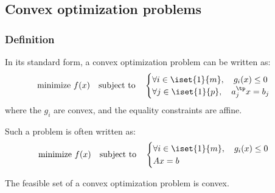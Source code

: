 \subsection{Convex optimization problems}
\subsubsection{Definition}
\begin{definition}
    \label{def:convex-optimization-problem}
    In its standard form, a convex optimization problem can be written as:
    \begin{equation*}
        \text{minimize } f(x) \quad\text{subject to}\quad \begin{cases}
            \forall i\in\iset{1}{m}, \quad g_i(x)\leq 0\\
            \forall j\in\iset{1}{p}, \quad a_j^\tp x = b_j
        \end{cases}
    \end{equation*}
    where the $g_i$ are convex, and the equality constraints are affine.

    Such a problem is often written as:
    \begin{equation*}
        \text{minimize } f(x) \quad\text{subject to}\quad \begin{cases}
            \forall i\in\iset{1}{m}, \quad g_i(x)\leq 0\\
            Ax = b
        \end{cases}
    \end{equation*}
\end{definition}

\begin{remark}
    The feasible set of a convex optimization problem is convex.
\end{remark}

